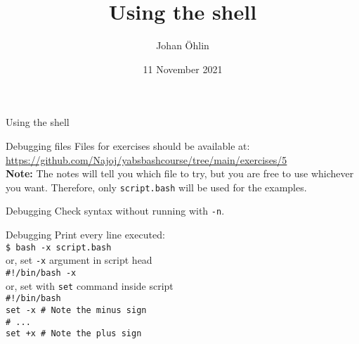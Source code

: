 \documentclass{beamer}
\title{Using the shell}
\date{11 November 2021}
\author{Johan Öhlin}
\institute{Yabs}
\let\tt\texttt
\let\bf\textbf
\begin{document}
\begin{frame}{Using the shell}
\maketitle
\end{frame}

\begin{frame}{Debugging files}
    Files for exercises should be available at:    \\
    \url{https://github.com/Najoj/yabsbashcourse/tree/main/exercises/5} \\
    \bf{Note:} The notes will tell you which file to try, but you are free to use whichever you want. Therefore, only \tt{script.bash} will be used for the examples.
\end{frame}

\begin{frame}{Debugging}
    Check syntax without running with \tt{-n}.
\end{frame}

\begin{frame}{Debugging}
    Print every line executed:      \\
    \tt{\$ bash -x script.bash}     \\
    or, set \tt{-x} argument in script head \\
    \tt{\#!/bin/bash -x}            \\
    or, set with \tt{set} command inside script \\
    \tt{\#!/bin/bash}               \\
    \tt{set -x  \# Note the minus sign} \\
    \tt{\# ...}                         \\
    \tt{set +x  \# Note the plus sign}  \\
\end{frame}
\end{document}
